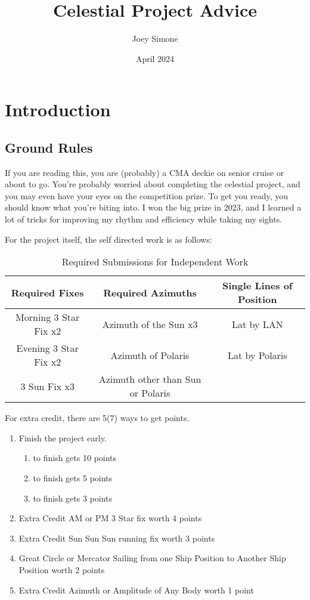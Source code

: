 \documentclass[letterpaper,12pt]{article}
\title{Celestial Project Advice}
\author{Joey Simone}
\date{April 2024}
\begin{document}
\maketitle
\tableofcontents
\section{Introduction}
\subsection{Ground Rules}
If you are reading this, you are (probably) a CMA deckie on senior cruise or about to go. You're probably worried about completing the celestial project, and you may even have your eyes on the competition prize. To get you ready, you should know what you're biting into. I won the big prize in 2023, and I learned a lot of tricks for improving my rhythm and efficiency while taking my sights.

For the project itself, the self directed work is as follows:


\begin{table}[htbp]
    \centering
    \begin{tabular}{|c|c|c|}
    \hline
        Required Fixes & Required Azimuths & Single Lines of Position\\
        \hline
        Morning 3 Star Fix x2 & Azimuth of the Sun x3\footnotemark{} & Lat by LAN\\
        Evening 3 Star Fix x2 & Azimuth of Polaris & Lat by Polaris \\
        3 Sun Fix x3 & Azimuth other than Sun or Polaris & \\
        \hline
    \end{tabular}
    \caption{Required Submissions for Independent Work}
    \label{tab:solo}
\end{table}
For extra credit, there are 5(7) ways to get points.
\begin{enumerate}
    \item Finish the project early. \begin{enumerate}
        \item {} to finish gets 10 points
        \item {} to finish gets 5 points
        \item {} to finish gets 3 points
    \end{enumerate}
    \item Extra Credit AM or PM 3 Star fix worth 4 points
    \item Extra Credit Sun Sun Sun running fix worth 3 points
    \item Great Circle or Mercator Sailing from one Ship Position to Another Ship Position worth 2 points
    \item Extra Credit Azimuth or Amplitude of Any Body worth 1 point
\end{enumerate}
\end{document}
